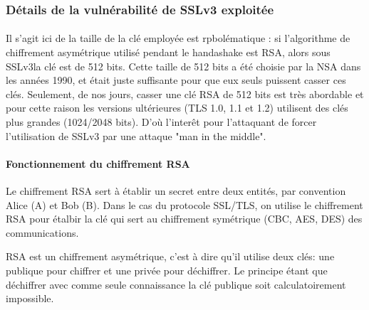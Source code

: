 \subsubsection{Détails de la vulnérabilité de SSLv3 exploitée}
\paragraph{}
Il s'agit ici de la taille de la clé employée est rpbolématique : si l'algorithme de chiffrement asymétrique utilisé pendant le handashake est RSA, alors sous SSLv3la clé est de 512 bits. Cette taille de 512 bits a été choisie par la NSA dans les années 1990, et était juste suffisante pour que eux seuls puissent casser ces clés. Seulement, de nos jours, casser une clé RSA de 512 bits est très abordable et pour cette raison les versions ultérieures  (TLS 1.0, 1.1 et 1.2) utilisent des clés plus grandes (1024/2048 bits). D'où l'inter\^et pour l'attaquant de forcer l'utilisation de SSLv3 par une attaque "man in the middle".

\paragraph{Fonctionnement du chiffrement RSA}

Le chiffrement RSA sert à établir un secret entre deux entités, par convention Alice (A) et Bob (B). Dans le cas du protocole SSL/TLS, on utilise le chiffrement RSA pour étalbir la clé qui sert au chiffrement symétrique (CBC, AES, DES) des communications. 

RSA est un chiffrement asymétrique, c'est à dire qu'il utilise deux clés: une publique pour chiffrer et une privée pour déchiffrer. Le principe étant que déchiffrer avec comme seule connaissance la clé publique soit calculatoirement impossible. \\

